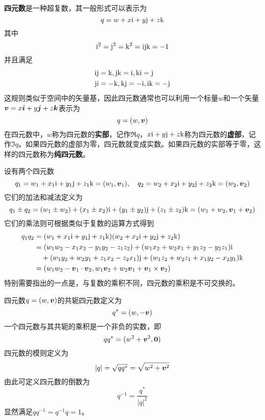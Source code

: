 {\bf 四元数}是一种超复数，其一般形式可以表示为
\begin{equation}
	q = w+x\mathrm{i}+y\mathrm{j}+z\mathrm{k}
\end{equation}
其中
\begin{equation*}
	\mathrm{i}^2=\mathrm{j}^2=\mathrm{k}^2=\mathrm{i}\mathrm{j}\mathrm{k}=-1
\end{equation*}
并且满足
\begin{align*}
	& \mathrm{i}\mathrm{j}=\mathrm{k}, \mathrm{j}\mathrm{k}=\mathrm{i},\mathrm{k}\mathrm{i}=\mathrm{j} \\
	& \mathrm{j}\mathrm{i}=-\mathrm{k}, \mathrm{k}\mathrm{j}=-\mathrm{i},\mathrm{i}\mathrm{k}=-\mathrm{j} 
\end{align*}
这规则类似于空间中的矢量基，因此四元数通常也可以利用一个标量$w$和一个矢量$\boldsymbol{v}=x\boldsymbol{i}+y\boldsymbol{j}+z\boldsymbol{k}$表示为
\begin{equation}
	q = (w,\boldsymbol{v})
\end{equation}
在四元数中，$w$称为四元数的{\bf 实部}，记作$\Re q$，$x\mathrm{i}+y\mathrm{j}+z\mathrm{k}$称为四元数的{\bf 虚部}，记作$\Im q$。如果四元数的虚部为零，四元数就变成实数。如果四元数的实部等于零，这样的四元数称为{\bf 纯四元数}。

设有两个四元数
\begin{equation*}
	q_1 = w_1+x_1\mathrm{i}+y_1\mathrm{j}+z_1\mathrm{k} = (w_1,\boldsymbol{v}_1),\quad q_2 = w_2+x_2\mathrm{i}+y_2\mathrm{j}+z_2\mathrm{k} = (w_2,\boldsymbol{v}_2)
\end{equation*}
它们的加法和减法定义为
\begin{equation}
	q_1\pm q_2=(w_1\pm w_2)+(x_1\pm x_2)\mathrm{i}+(y_1\pm y_2)\mathrm{j}+(z_1\pm z_2)\mathrm{k} = (w_1+w_2,\boldsymbol{v}_1+\boldsymbol{v}_2)
\end{equation}
它们的乘法则可根据类似于复数的运算方式得到
\begin{align}
	q_1q_2 & = (w_1+x_1\mathrm{i}+y_1\mathrm{j}+z_1\mathrm{k})(w_2+x_2\mathrm{i}+y_2\mathrm{j}+z_2\mathrm{k}) \nonumber \\
	& = (w_1w_2-x_1x_2-y_1y_2-z_1z_2) + (w_1x_2+w_2x_1+y_1z_2-y_2z_1)\mathrm{i} \nonumber \\
	& \quad {} + (w_1y_2 + w_2y_1 + z_1x_2 - z_2x_1)\mathrm{j} + (w_1z_2 + w_2z_1 + x_1y_2 - x_2y_1)\mathrm{k} \\
	& = (w_1w_2-\boldsymbol{v}_1\cdot\boldsymbol{v}_2,w_1\boldsymbol{v}_2+w_2\boldsymbol{v}_1+\boldsymbol{v}_1\times\boldsymbol{v}_2)
	\label{chapter6:四元数乘法的运算规则}
\end{align}
特别需要指出的一点是，与复数的乘积不同，四元数的乘积是不可交换的。

四元数$q=(w,\boldsymbol{v})$的共轭四元数定义为
\begin{equation}
	q^* = (w,-\boldsymbol{v})
\end{equation}
一个四元数与其共轭的乘积是一个非负的实数，即
\begin{equation}
	qq^* = (w^2+\boldsymbol{v}^2,\boldsymbol{0})
\end{equation}
四元数的模则定义为
\begin{equation}
	|q| = \sqrt{qq^*} = \sqrt{w^2+\boldsymbol{v}^2}
\end{equation}
由此可定义四元数的倒数为
\begin{equation}
	q^{-1} = \frac{q^*}{|q|^2}
\end{equation}
显然满足$qq^{-1}=q^{-1}q=1$。

